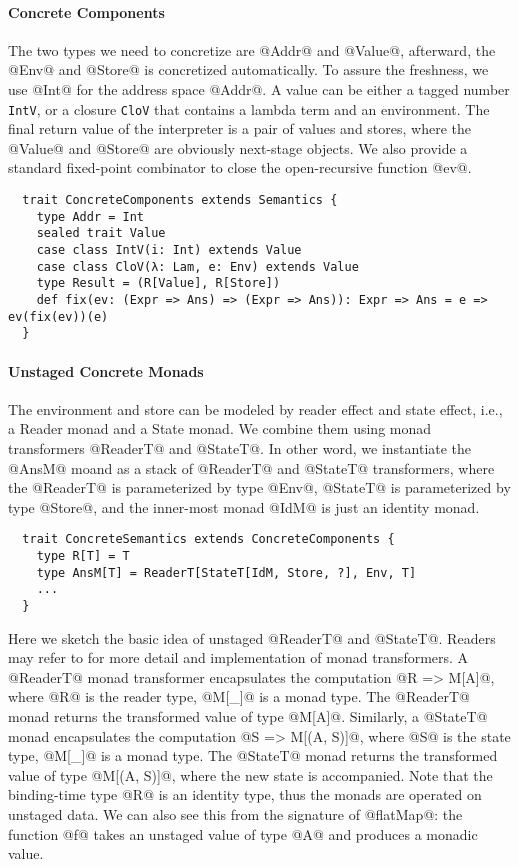 \paragraph{Concrete Components}
The two types we need to concretize are @Addr@ and @Value@, afterward, the @Env@
and @Store@ is concretized automatically. To assure the freshness, we use @Int@
for the address space @Addr@. A value can be either a tagged number
\texttt{IntV}, or a closure \texttt{CloV} that contains a lambda term and an
environment. The final return value of the interpreter is a pair of values and
stores, where the @Value@ and @Store@ are obviously next-stage objects. We also
provide a standard fixed-point combinator to close the open-recursive function @ev@.

\begin{lstlisting}
  trait ConcreteComponents extends Semantics {
    type Addr = Int
    sealed trait Value
    case class IntV(i: Int) extends Value
    case class CloV(λ: Lam, e: Env) extends Value
    type Result = (R[Value], R[Store])
    def fix(ev: (Expr => Ans) => (Expr => Ans)): Expr => Ans = e => ev(fix(ev))(e)
  }
\end{lstlisting}

\paragraph{Unstaged Concrete Monads}
The environment and store can be modeled by reader effect and state effect,
i.e., a Reader monad and a State monad. We combine them using monad transformers
@ReaderT@ and @StateT@.
In other word, we instantiate the @AnsM@ moand as a stack of @ReaderT@ and @StateT@
transformers, where the @ReaderT@ is parameterized by type @Env@, @StateT@ is
parameterized by type @Store@, and the inner-most monad @IdM@ is just an identity
monad.

\begin{lstlisting}
  trait ConcreteSemantics extends ConcreteComponents {
    type R[T] = T
    type AnsM[T] = ReaderT[StateT[IdM, Store, ?], Env, T]
    ...
  }
\end{lstlisting}

Here we sketch the basic idea of unstaged @ReaderT@ and @StateT@. Readers may
refer to  for more detail and implementation of monad
transformers.
A @ReaderT@ monad transformer encapsulates the computation @R => M[A]@, where
@R@ is the reader type, @M[_]@ is a monad type. The @ReaderT@ monad returns the
transformed value of type @M[A]@. Similarly, a @StateT@ monad encapsulates the
computation @S => M[(A, S)]@, where @S@ is the state type, @M[_]@ is a monad
type. The @StateT@ monad returns the transformed value of type @M[(A, S)]@,
where the new state is accompanied.
Note that the binding-time type @R@ is an identity type, thus the monads are
operated on unstaged data. We can also see this from the signature of @flatMap@:
the function @f@ takes an unstaged value of type @A@ and produces a monadic
value.

